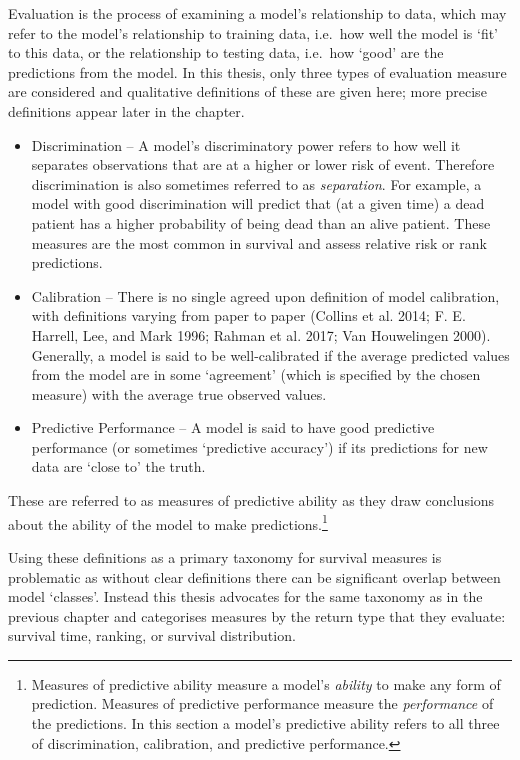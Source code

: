 \documentclass[
  letterpaper,
]{scrbook}
\providecommand{\tightlist}{%
  \setlength{\itemsep}{0pt}\setlength{\parskip}{0pt}}\usepackage{longtable,booktabs,array}
\theoremstyle{plain}
\theoremstyle{definition}
\theoremstyle{remark}
\begin{document}
Evaluation is the process of examining a model's relationship to data,
which may refer to the model's relationship to training data, i.e.~how
well the model is `fit' to this data, or the relationship to testing
data, i.e.~how `good' are the predictions from the model. In this
thesis, only three types of evaluation measure are considered and
qualitative definitions of these are given here; more precise
definitions appear later in the chapter.

\begin{itemize}
\tightlist
\item
  Discrimination -- A model's discriminatory power refers to how well it
  separates observations that are at a higher or lower risk of event.
  Therefore discrimination is also sometimes referred to as
  \emph{separation}. For example, a model with good discrimination will
  predict that (at a given time) a dead patient has a higher probability
  of being dead than an alive patient. These measures are the most
  common in survival and assess relative risk or rank predictions.
\item
  Calibration -- There is no single agreed upon definition of model
  calibration, with definitions varying from paper to paper (Collins et
  al. 2014; F. E. Harrell, Lee, and Mark 1996; Rahman et al. 2017; Van
  Houwelingen 2000). Generally, a model is said to be well-calibrated if
  the average predicted values from the model are in some `agreement'
  (which is specified by the chosen measure) with the average true
  observed values.
\item
  Predictive Performance -- A model is said to have good predictive
  performance (or sometimes `predictive accuracy') if its predictions
  for new data are `close to' the truth.
\end{itemize}

These are referred to as measures of predictive ability as they draw
conclusions about the ability of the model to make
predictions.\footnote{Measures of predictive ability measure a model's
  \emph{ability} to make any form of prediction. Measures of predictive
  performance measure the \emph{performance} of the predictions. In this
  section a model's predictive ability refers to all three of
  discrimination, calibration, and predictive performance.}

Using these definitions as a primary taxonomy for survival measures is
problematic as without clear definitions there can be significant
overlap between model `classes'. Instead this thesis advocates for the
same taxonomy as in the previous chapter and categorises measures by the
return type that they evaluate: survival time, ranking, or survival
distribution.
\end{document}
